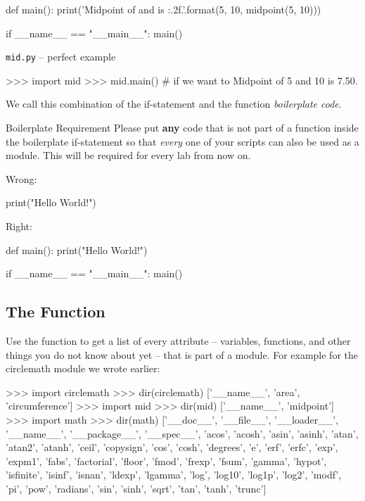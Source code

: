 \documentclass[11pt]{cselabheader}
\begin{document}
{\begin{listing}[H]
\begin{python3code}
def main():
    print('Midpoint of {} and {} is {:.2f}.'.format(5, 10, midpoint(5, 10)))

if __name__ == "__main__":
    main()
\end{python3code}
  \vspace{-1em}
  \caption{\texttt{mid.py} -- perfect example}
  \vspace{-0.5em}
\end{listing}

\begin{pyconcode}
>>> import mid
>>> mid.main() # if we want to
Midpoint of 5 and 10 is 7.50.
\end{pyconcode}


We call this combination of the if-statement and the
 function \emph{boilerplate code}.

\begin{infobox}{Boilerplate Requirement}
  Please put \textbf{any} code that is not part of a function inside the
  boilerplate if-statement so that \emph{every} one of your scripts can also be
  used as a module. This will be required for every lab from now on.

  Wrong:

  \begin{python3code}
print("Hello World!")
  \end{python3code}

  Right:

  \begin{python3code}
def main():
    print("Hello World!")

if __name__ == "__main__":
    main()
  \end{python3code}
\end{infobox}

\subsection{The \protect{} Function}

Use the  function to get a list of every attribute --
variables, functions, and other things you do not know about yet -- that is part
of a module. For example for the circlemath module we wrote earlier:

\begin{pyconcode}
>>> import circlemath
>>> dir(circlemath)
['__name__', 'area', 'circumference']
>>> import mid
>>> dir(mid)
['__name__', 'midpoint']
>>> import math
>>> dir(math)
['__doc__', '__file__', '__loader__', '__name__', '__package__', '__spec__', 'acos',
'acosh', 'asin', 'asinh', 'atan', 'atan2', 'atanh', 'ceil', 'copysign', 'cos', 'cosh',
'degrees', 'e', 'erf', 'erfc', 'exp', 'expm1', 'fabs', 'factorial', 'floor', 'fmod',
'frexp', 'fsum', 'gamma', 'hypot', 'isfinite', 'isinf', 'isnan', 'ldexp', 'lgamma',
'log', 'log10', 'log1p', 'log2', 'modf', 'pi', 'pow', 'radians', 'sin', 'sinh', 'sqrt',
'tan', 'tanh', 'trunc']
\end{pyconcode}

}
\end{document}

